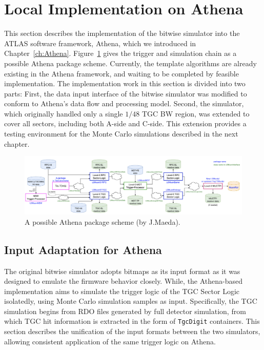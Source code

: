 \section{Local Implementation on Athena} \label{sec:LocalImplementationOnAthena}
This section describes the implementation of the bitwise simulator into the ATLAS software framework, Athena, which we introduced in Chapter~\ref{ch:Athena}. Figure~\ref{fig:L0_trigger_chain} gives the trigger and simulation chain as a possible Athena package scheme. Currently, the template algorithms are already existing in the Athena framework, and waiting to be completed by feasible implementation. The implementation work in this section is divided into two parts: 
First, the data input interface of the bitwise simulator was modified to conform to Athena's data flow and processing model. Second, the simulator, which originally handled only a single \(1/48\) TGC BW region, was extended to cover all sectors, including both A-side and C-side. This extension provides a testing environment for the Monte Carlo simulations described in the next chapter.
\begin{figure}[htbp]
  \centering
  \includegraphics[width=1.0\textwidth]{figs/chapter5/L0_trigger_chain.png}
  \caption{A possible Athena package scheme (by J.Maeda).}
  \label{fig:L0_trigger_chain}
\end{figure}
\subsection{Input Adaptation for Athena} \label{subsec:InputAdaptation}
The original bitwise simulator adopts bitmaps as its input format as it was designed to emulate the firmware behavior closely. While, the Athena-based implementation aims to simulate the trigger logic of the TGC Sector Logic isolatedly, using Monte Carlo simulation samples as input. Specifically, the TGC simulation begins from RDO files generated by full detector simulation, from which TGC hit information is extracted in the form of \texttt{TgcDigit} containers. This section describes the unification of the input formats between the two simulators, allowing consistent application of the same trigger logic on Athena.

